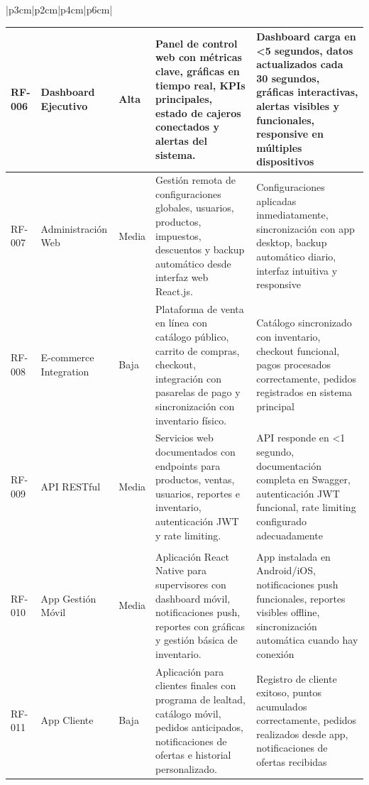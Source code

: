 \documentclass[12pt,letterpaper]{article}
\begin{document}
\begin{longtable}{|p{3cm}|p{2cm}|p{4cm}|p{6cm}|}
\begin{longtable}{|>{\centering}p{1.5cm}|p{3.5cm}|>{\centering}p{2cm}|p{6.5cm}|>{\centering\arraybackslash}p{2.5cm}|}
RF-006 & Dashboard Ejecutivo & Alta & Panel de control web con métricas clave, gráficas en tiempo real, KPIs principales, estado de cajeros conectados y alertas del sistema. & Dashboard carga en <5 segundos, datos actualizados cada 30 segundos, gráficas interactivas, alertas visibles y funcionales, responsive en múltiples dispositivos \\
\hline

RF-007 & Administración Web & Media & Gestión remota de configuraciones globales, usuarios, productos, impuestos, descuentos y backup automático desde interfaz web React.js. & Configuraciones aplicadas inmediatamente, sincronización con app desktop, backup automático diario, interfaz intuitiva y responsive \\
\hline

RF-008 & E-commerce Integration & Baja & Plataforma de venta en línea con catálogo público, carrito de compras, checkout, integración con pasarelas de pago y sincronización con inventario físico. & Catálogo sincronizado con inventario, checkout funcional, pagos procesados correctamente, pedidos registrados en sistema principal \\
\hline

RF-009 & API RESTful & Media & Servicios web documentados con endpoints para productos, ventas, usuarios, reportes e inventario, autenticación JWT y rate limiting. & API responde en <1 segundo, documentación completa en Swagger, autenticación JWT funcional, rate limiting configurado adecuadamente \\
\hline

\multicolumn{5}{|c|}{\cellcolor{cobraorange!20}\textbf{FASE 3: APLICACIONES MÓVILES}} \\
\hline

RF-010 & App Gestión Móvil & Media & Aplicación React Native para supervisores con dashboard móvil, notificaciones push, reportes con gráficas y gestión básica de inventario. & App instalada en Android/iOS, notificaciones push funcionales, reportes visibles offline, sincronización automática cuando hay conexión \\
\hline

RF-011 & App Cliente & Baja & Aplicación para clientes finales con programa de lealtad, catálogo móvil, pedidos anticipados, notificaciones de ofertas e historial personalizado. & Registro de cliente exitoso, puntos acumulados correctamente, pedidos realizados desde app, notificaciones de ofertas recibidas \\
\hline
\end{longtable}


\end{longtable}
\end{document}
